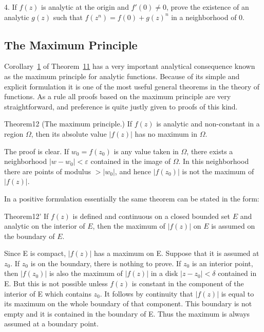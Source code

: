 4. If $f(z)$ is analytic at the origin and $f'(0) \neq 0$, prove the existence of an analytic $g(z)$ such that $f(z^{n}) = f(0) + g(z)^{n}$ in a neighborhood of 0.

\setcounter{section}{3}\setcounter{subsection}{3}\subsection{The Maximum Principle}\label{sec:4.3.4}
Corollary~\hyperref[cor:4.1]{1} of Theorem~\hyperref[thm:4.11]{11} has a very important analytical consequence known as the maximum principle for
analytic functions. Because of its simple and explicit formulation it is one of the most useful general theorems in the theory of functions. As a rule all proofs based on the maximum principle are very straightforward, and preference is quite justly given to proofs of this kind.

\begin{originalstatement}{Theorem}{12}\label{thm:4.12}
(The maximum principle.) If $f(z)$ is analytic and non-constant in a region $\Omega$, then its absolute value $|f(z)|$ has no maximum in $\Omega$.
\end{originalstatement}
The proof is clear. If $w_{0} = f(z_{0})$ is any value taken in $\Omega$, there exists a neighborhood $|w - w_{0}| < \varepsilon$ contained in the image of $\Omega$. In this neighborhood there are points of modulus $> |w_{0}|$, and hence $|f(z_{0})|$ is not the maximum of $|f(z)|$.

In a positive formulation essentially the same theorem can be stated in the form:

\begin{originalstatement}{Theorem}{12'}\label{thm:4.12prime}
If $f(z)$ is defined and continuous on a closed bounded set $E$ and analytic on the interior of $E$, then the maximum of $|f(z)|$ on $E$ is assumed on the boundary of $E$.
\end{originalstatement}

Since E is compact, $|f(z)|$ has a maximum on E. Suppose that it is assumed at $z_{0}$. If $z_{0}$ is on the boundary, there is nothing to prove. If $z_{0}$ is an interior point, then $|f(z_{0})|$ is also the maximum of $|f(z)|$ in a disk $|z - z_{0}| < \delta$ contained in E. But this is not possible unless $f(z)$ is constant in the component of the interior of E which contains $z_{0}$. It follows by continuity that $|f(z)|$ is equal to its maximum on the whole boundary of that component. This boundary is not empty and it is contained in the boundary of E. Thus the maximum is always assumed at a boundary point.

